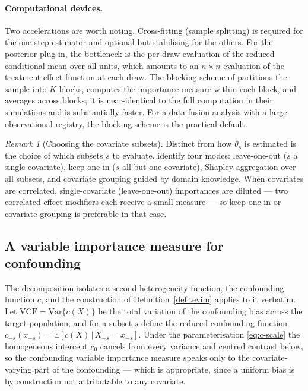 \documentclass[11pt]{report}
\theoremstyle{plain}
\theoremstyle{definition}
\theoremstyle{remark}
\newcommand{\E}{\mathbb{E}}
\newcommand{\1}{\mathds{1}}
\theoremstyle{plain}
\theoremstyle{remark}
\newtheorem{remark}[theorem]{Remark}
\newcommand{\Var}{\mathrm{Var}}
\newcommand{\given}{\,\vert\,}
\newcommand{\vcf}{\mathrm{VCF}}
\begin{document}
\paragraph{Computational devices.}
Two accelerations are worth noting. Cross-fitting (sample splitting) is required
for the one-step estimator and optional but stabilising for the others. For the
posterior plug-in, the bottleneck is the per-draw evaluation of the reduced
conditional mean over all units, which amounts to an $n \times n$ evaluation of
the treatment-effect function at each draw. The blocking scheme of
\citet{shin2024} partitions the sample into $K$ blocks, computes the importance
measure within each block, and averages across blocks; it is near-identical to
the full computation in their simulations and is substantially faster. For a
data-fusion analysis with a large observational registry, the blocking scheme is
the practical default.

\begin{remark}[Choosing the covariate subsets]
\label{rem:vim-modes}
Distinct from how $\theta_s$ is estimated is the choice of which subsets $s$ to
evaluate. \citet{hines2022} identify four modes: leave-one-out ($s$ a single
covariate), keep-one-in ($s$ all but one covariate), Shapley aggregation over all
subsets, and covariate grouping guided by domain knowledge. When covariates are
correlated, single-covariate (leave-one-out) importances are diluted --- two
correlated effect modifiers each receive a small measure --- so keep-one-in or
covariate grouping is preferable in that case.
\end{remark}

\subsection{A variable importance measure for confounding}

The decomposition isolates a second heterogeneity function, the confounding
function $c$, and the construction of Definition~\ref{def:tevim} applies to it
verbatim. Let $\vcf = \Var\{c(X)\}$ be the total variation of the confounding
bias across the target population, and for a subset $s$ define the reduced
confounding function $c_{-s}(x_{-s}) = \E[c(X) \given X_{-s} = x_{-s}]$. Under
the parameterisation \eqref{eq:c-scale} the homogeneous intercept $c_0$ cancels
from every variance and centred contrast below, so the confounding variable
importance measure speaks only to the covariate-varying part of the
confounding --- which is appropriate, since a uniform bias is by construction
not attributable to any covariate.
\end{document}
